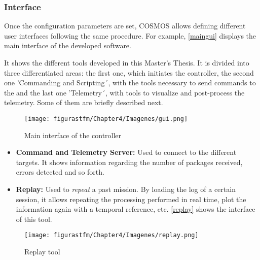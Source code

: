 \subsubsection{Interface}

Once the configuration parameters are set, COSMOS allows defining different user interfaces following the same procedure. For example, \autoref{maingui} displays the main interface of the developed  software.

It shows the different tools developed in this Master's Thesis. It is divided into three differentiated areas: the first one, which initiates the controller, the second one 'Commanding and Scripting´, with the tools necessary to send commands to the  and the last one 'Telemetry´, with tools to visualize and post-process the telemetry. Some of them are briefly described next.

\begin{figure} [h]
			\centering
			\texttt{[image: figurastfm/Chapter4/Imagenes/gui.png]}
			\caption{Main interface of the   controller} \label{maingui}
			\vspace{0.5cm}
\end{figure}

\begin{itemize} [noitemsep]
	\item \textbf{Command and Telemetry Server:} Used to connect to the different targets. It shows information regarding the number of packages received, errors detected and so forth.
\end{itemize}


\begin{itemize} [noitemsep,topsep=0pt]
	\item \textbf{Replay:} Used to \textit{repeat} a past mission. By loading the log of a certain session, it allows repeating the processing performed in real time, plot the information again with a temporal reference, etc. \autoref{replay} shows the interface of this tool.
\end{itemize}

\begin{figure} [H]
			\centering
			\texttt{[image: figurastfm/Chapter4/Imagenes/replay.png]}
			\caption{Replay tool} \label{replay}
\end{figure}



